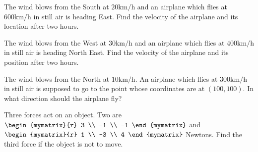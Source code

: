 \begin{enumialphparenastyle}

\begin{ex} The wind blows from the South at $20\textrm{km}/\textrm{h}$ and an
airplane which flies at $600\textrm{km}/\textrm{h}$ in still air is heading
East. Find the velocity of the airplane and its location after
two hours. \vspace{1mm}
\end{ex}

\begin{ex} The wind blows from the West at $30\textrm{km}/\textrm{h}$ and an
airplane which flies at $400\textrm{km}/\textrm{h}$ in still air is heading
North East. Find the velocity of the airplane and its position
after two hours. \vspace{1mm}
\end{ex}

\begin{ex} The wind blows from the North at $10\textrm{km}/\textrm{h}$. An
airplane which flies at $300\textrm{km}/\textrm{h}$ in still air is supposed
to go to the point whose coordinates are at $\left( 100, 100 \right). $ In what direction should the airplane fly? \vspace{1mm}
\end{ex}

\begin{ex} Three forces act on an object. Two are $\begin{mymatrix}{r}
3 \\
-1 \\
-1
\end{mymatrix} $ and $\begin{mymatrix}{r}
1 \\
-3 \\
4
\end{mymatrix} $ Newtons. Find the third force if the object is not to move.
\vspace{1mm}
\end{ex}


\end{enumialphparenastyle}

